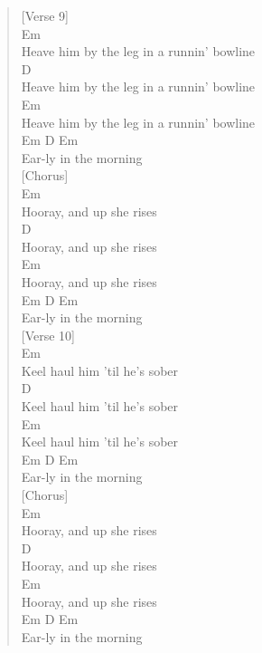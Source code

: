 \documentclass[11pt]{article}
\begin{document}
\begin{verse}
\vspace*{1em}
\vspace*{1em}
[Verse 9]\\
Em\\
Heave him by the leg in a runnin' bowline\\
D\\
Heave him by the leg in a runnin' bowline\\
Em\\
Heave him by the leg in a runnin' bowline\\
Em  D         Em\\
Ear-ly in the morning\\
\vspace*{1em}
\vspace*{1em}
[Chorus]\\
Em\\
Hooray, and up she rises\\
D\\
Hooray, and up she rises\\
Em\\
Hooray, and up she rises\\
Em  D         Em\\
Ear-ly in the morning\\
\vspace*{1em}
\vspace*{1em}
[Verse 10]\\
Em\\
Keel haul him 'til he's sober\\
D\\
Keel haul him 'til he's sober\\
Em\\
Keel haul him 'til he's sober\\
Em  D         Em\\
Ear-ly in the morning\\
\vspace*{1em}
\vspace*{1em}
[Chorus]\\
Em\\
Hooray, and up she rises\\
D\\
Hooray, and up she rises\\
Em\\
Hooray, and up she rises\\
Em  D         Em\\
Ear-ly in the morning\\
\vspace*{1em}
\vspace*{1em}

\end{verse}
\end{document}
